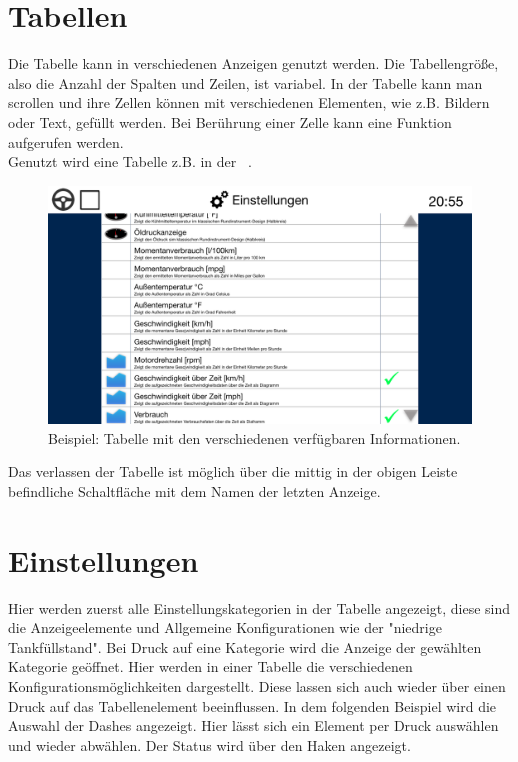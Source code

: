 \documentclass[pflichtenheft.tex]{subfiles}
\begin{document}
\clearpage
\section{Tabellen}

Die Tabelle kann in verschiedenen Anzeigen genutzt werden. Die Tabellengröße, also die Anzahl der Spalten und Zeilen, ist variabel. In der Tabelle kann man scrollen und ihre Zellen können mit verschiedenen Elementen, wie z.B. Bildern oder Text, gefüllt werden. Bei Berührung einer Zelle kann eine Funktion aufgerufen werden.\\
Genutzt wird eine Tabelle z.B. in der ~. 

\begin{figure}[H]
  	\begin{center}
 		\includegraphics[width=\textwidth]{Images/GUI-SettingsDashes.png}
  		\caption{Beispiel: Tabelle mit den verschiedenen verfügbaren Informationen.}
  	\end{center}
\end{figure}


Das verlassen der Tabelle ist möglich über die mittig in der obigen Leiste befindliche Schaltfläche mit dem Namen der letzten Anzeige. 

\clearpage
\section{Einstellungen}
Hier werden zuerst alle Einstellungskategorien in der Tabelle angezeigt, diese sind die Anzeigeelemente und Allgemeine Konfigurationen wie der "niedrige Tankfüllstand". Bei Druck auf eine Kategorie wird die Anzeige der gewählten Kategorie geöffnet. Hier werden in einer Tabelle die verschiedenen Konfigurationsmöglichkeiten dargestellt. Diese lassen sich auch wieder über einen Druck auf das Tabellenelement beeinflussen. 
In dem folgenden Beispiel wird die Auswahl der Dashes angezeigt. Hier lässt sich ein Element per Druck auswählen und wieder abwählen. Der Status wird über den Haken angezeigt.
\end{document}
